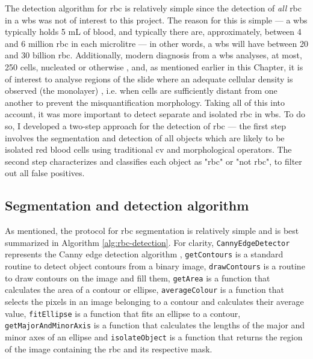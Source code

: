 The detection algorithm for \ac{rbc} is relatively simple since the detection of \textit{all} \ac{rbc} in a \ac{wbs} was not of interest to this project. The reason for this is simple --- a \ac{wbs} typically holds 5 mL of blood, and typically there are, approximately, between 4 and 6 million \ac{rbc} in each microlitre \cite{Bain2004-uq} --- in other words, a \ac{wbs} will have between 20 and 30 billion \ac{rbc}. Additionally, modern diagnosis from a \ac{wbs} analyses, at most, 250 cells, nucleated or otherwise \cite{Bain2005-zg}, and, as mentioned earlier in this Chapter, it is of interest to analyse regions of the slide where an adequate cellular density is observed (the monolayer) \cite{Adewoyin2014-vo}, i.e. when cells are sufficiently distant from one another to prevent the misquantification morphology. Taking all of this into account, it was more important to detect separate and isolated \ac{rbc} in \ac{wbs}. To do so, I developed a two-step approach for the detection of \ac{rbc} --- the first step involves the segmentation and detection of all objects which are likely to be isolated red blood cells using traditional \ac{cv} and morphological operators. The second step characterizes and classifies each object as "\ac{rbc}" or "not \ac{rbc}", to filter out all false positives.

\subsection{Segmentation and detection algorithm}

As mentioned, the protocol for \ac{rbc} segmentation is relatively simple and is best summarized in Algorithm \ref{alg:rbc-detection}. For clarity, \texttt{CannyEdgeDetector} represents the Canny edge detection algorithm \cite{Canny1986-pi}, \texttt{getContours} is a standard routine to detect object contours from a binary image, \texttt{drawContours} is a routine to draw contours on the image and fill them, \texttt{getArea} is a function that calculates the area of a contour or ellipse, \texttt{averageColour} is a function that selects the pixels in an image belonging to a contour and calculates their average value, \texttt{fitEllipse} is a function that fits an ellipse to a contour, \texttt{getMajorAndMinorAxis} is a function that calculates the lengths of the major and minor axes of an ellipse and \texttt{isolateObject} is a function that returns the region of the image containing the \ac{rbc} and its respective mask. 

